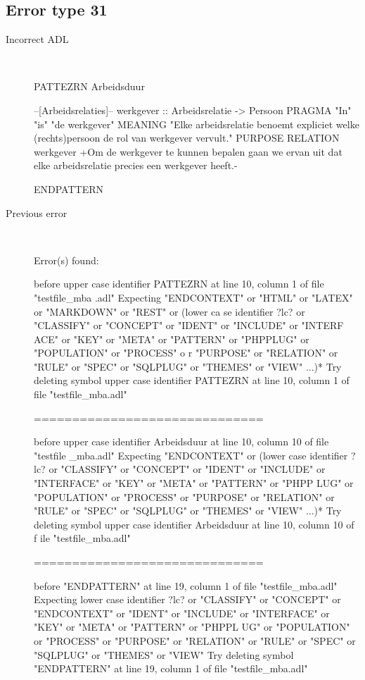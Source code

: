 \hrulefill

\subsection{Error type 31}
  \begin{description}
  \item[Incorrect ADL]~\\
\begin{adl}
PATTEZRN Arbeidsduur

--[Arbeidsrelaties]--
werkgever :: Arbeidsrelatie -> Persoon
PRAGMA "In" "is" "de werkgever"
MEANING "Elke arbeidsrelatie benoemt expliciet welke (rechts)persoon de rol van werkgever vervult."
PURPOSE RELATION werkgever
{+Om de werkgever te kunnen bepalen gaan we ervan uit dat elke arbeidsrelatie precies een werkgever heeft.-}

ENDPATTERN\end{adl}
  \item[Previous error]~\\
\begin{haskell}
Error(s) found:

before upper case identifier PATTEZRN at line 10, column 1 of file "testfile_mba
.adl"
Expecting "ENDCONTEXT" or "HTML" or "LATEX" or "MARKDOWN" or "REST" or (lower ca
se identifier ?lc? or "CLASSIFY" or "CONCEPT" or "IDENT" or "INCLUDE" or "INTERF
ACE" or "KEY" or "META" or "PATTERN" or "PHPPLUG" or "POPULATION" or "PROCESS" o
r "PURPOSE" or "RELATION" or "RULE" or "SPEC" or "SQLPLUG" or "THEMES" or "VIEW"
 ...)*
Try deleting symbol upper case identifier PATTEZRN at line 10, column 1 of file
"testfile_mba.adl"

==============================

before upper case identifier Arbeidsduur at line 10, column 10 of file "testfile
_mba.adl"
Expecting "ENDCONTEXT" or (lower case identifier ?lc? or "CLASSIFY" or "CONCEPT"
 or "IDENT" or "INCLUDE" or "INTERFACE" or "KEY" or "META" or "PATTERN" or "PHPP
LUG" or "POPULATION" or "PROCESS" or "PURPOSE" or "RELATION" or "RULE" or "SPEC"
 or "SQLPLUG" or "THEMES" or "VIEW" ...)*
Try deleting symbol upper case identifier Arbeidsduur at line 10, column 10 of f
ile "testfile_mba.adl"

==============================

before "ENDPATTERN" at line 19, column 1 of file "testfile_mba.adl"
Expecting lower case identifier ?lc? or "CLASSIFY" or "CONCEPT" or "ENDCONTEXT"
or "IDENT" or "INCLUDE" or "INTERFACE" or "KEY" or "META" or "PATTERN" or "PHPPL
UG" or "POPULATION" or "PROCESS" or "PURPOSE" or "RELATION" or "RULE" or "SPEC"
or "SQLPLUG" or "THEMES" or "VIEW"
Try deleting symbol "ENDPATTERN" at line 19, column 1 of file "testfile_mba.adl"


\end{haskell}
\end{description}
